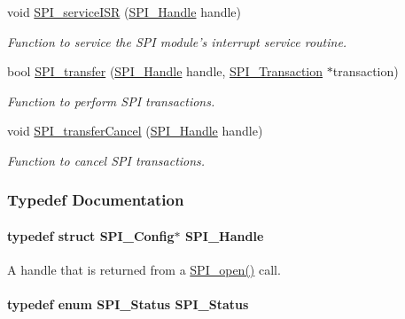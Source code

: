 \begin{DoxyCompactItemize}
void \hyperlink{_s_p_i_8h_aa6f1baa732ebbf0aa7cd5c3f7dfd215a}{S\-P\-I\-\_\-service\-I\-S\-R} (\hyperlink{_s_p_i_8h_a728806534c3c3e8675cfbfb7d8e36f13}{S\-P\-I\-\_\-\-Handle} handle)
\begin{DoxyCompactList}\small\item\em Function to service the S\-P\-I module's interrupt service routine. \end{DoxyCompactList}\item 
bool \hyperlink{_s_p_i_8h_a989e17f96b54fcc3dc2cac5f8ac6bdb2}{S\-P\-I\-\_\-transfer} (\hyperlink{_s_p_i_8h_a728806534c3c3e8675cfbfb7d8e36f13}{S\-P\-I\-\_\-\-Handle} handle, \hyperlink{struct_s_p_i___transaction}{S\-P\-I\-\_\-\-Transaction} $\ast$transaction)
\begin{DoxyCompactList}\small\item\em Function to perform S\-P\-I transactions. \end{DoxyCompactList}\item 
void \hyperlink{_s_p_i_8h_a6819f7761fc3505c4f885653ff8121f0}{S\-P\-I\-\_\-transfer\-Cancel} (\hyperlink{_s_p_i_8h_a728806534c3c3e8675cfbfb7d8e36f13}{S\-P\-I\-\_\-\-Handle} handle)
\begin{DoxyCompactList}\small\item\em Function to cancel S\-P\-I transactions. \end{DoxyCompactList}\end{DoxyCompactItemize}


\subsubsection{Typedef Documentation}
\paragraph[{S\-P\-I\-\_\-\-Handle}]{\setlength{\rightskip}{0pt plus 5cm}typedef struct {\bf S\-P\-I\-\_\-\-Config}$\ast$ {\bf S\-P\-I\-\_\-\-Handle}}\label{_s_p_i_8h_a728806534c3c3e8675cfbfb7d8e36f13}


A handle that is returned from a \hyperlink{_s_p_i_8h_a62cfe494cb1df47cd602e8747e894fd1}{S\-P\-I\-\_\-open()} call. 

\paragraph[{S\-P\-I\-\_\-\-Status}]{\setlength{\rightskip}{0pt plus 5cm}typedef enum {\bf S\-P\-I\-\_\-\-Status}  {\bf S\-P\-I\-\_\-\-Status}}\label{_s_p_i_8h_adf1c6e6f919dd9f6887da6590a52fd6a}


